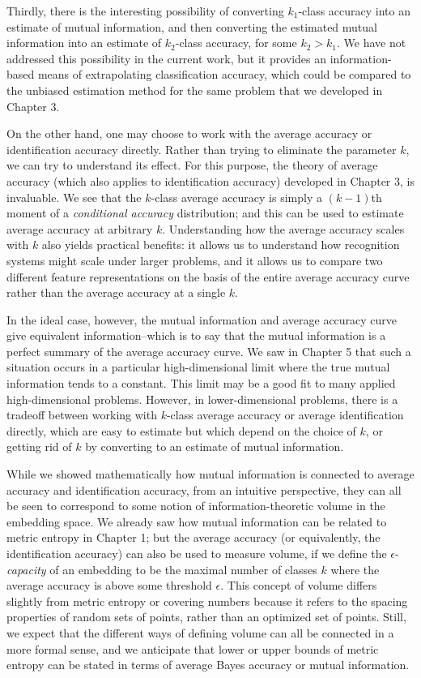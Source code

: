 Thirdly, there is the interesting possibility of converting
$k_1$-class accuracy into an estimate of mutual information, and then
converting the estimated mutual information into an estimate of
$k_2$-class accuracy, for some $k_2 > k_1$.  We have not addressed
this possibility in the current work, but it provides an
information-based means of extrapolating classification accuracy,
which could be compared to the unbiased estimation method for the same
problem that we developed in Chapter 3.

On the other hand, one may choose to work with the average accuracy or
identification accuracy directly.  Rather than trying to eliminate the
parameter $k$, we can try to understand its effect.  For this purpose,
the theory of average accuracy (which also applies to identification
accuracy) developed in Chapter 3, is invaluable.  We see that the
$k$-class average accuracy is simply a $(k-1)$th moment of a
\emph{conditional accuracy} distribution; and this can be used to
estimate average accuracy at arbitrary $k$.  Understanding how the
average accuracy scales with $k$ also yields practical benefits: it
allows us to understand how recognition systems might scale under
larger problems, and it allows us to compare two different feature
representations on the basis of the entire average accuracy curve
rather than the average accuracy at a single $k$.

In the ideal case, however, the mutual information and average
accuracy curve give equivalent information--which is to say that the
mutual information is a perfect summary of the average accuracy curve.
We saw in Chapter 5 that such a situation occurs in a particular
high-dimensional limit where the true mutual information tends to a
constant.  This limit may be a good fit to many applied
high-dimensional problems.  However, in lower-dimensional problems,
there is a tradeoff between working with $k$-class average accuracy or
average identification directly, which are easy to estimate but which
depend on the choice of $k$, or getting rid of $k$ by converting to an
estimate of mutual information.

While we showed mathematically how mutual information is connected to
average accuracy and identification accuracy, from an intuitive
perspective, they can all be seen to correspond to some notion of
information-theoretic volume in the embedding space.  We already saw
how mutual information can be related to metric entropy in Chapter 1;
but the average accuracy (or equivalently, the identification
accuracy) can also be used to measure volume, if we define the
$\epsilon$-\emph{capacity} of an embedding to be the maximal number of classes $k$
where the average accuracy is above some threshold $\epsilon$.  This
concept of volume differs slightly from metric entropy or covering
numbers because it refers to the spacing properties of random sets of
points, rather than an optimized set of points.  Still, we expect that
the different ways of defining volume can all be connected in a more
formal sense, and we anticipate that lower or upper bounds of metric
entropy can be stated in terms of average Bayes accuracy or mutual
information.

